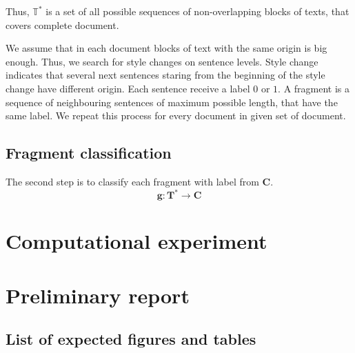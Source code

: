 \documentclass{article}
\begin{document}
Thus, $\mathbb{T}^*$ is a set of all possible sequences of non-overlapping blocks of texts, that covers complete document.

We assume that in each document blocks of text with the same origin is big enough. Thus, we search for style changes on sentence levels. Style change indicates that several next sentences staring from the beginning of the style change have different origin. Each sentence receive a label $0$ or $1$. A fragment is a sequence of neighbouring sentences of maximum possible length, that have the same label. We repeat this process for every document in given  set of document.


\subsection{Fragment classification}

The second step is to classify each fragment with label from $\mathbf{C}$.
$$\mathbf{g}: \mathbf{T}^* \rightarrow \mathbf{C}$$


\section{Computational experiment}
  
\section{Preliminary report}


\subsection{List of expected figures and tables}

\pagebreak


\end{document}
